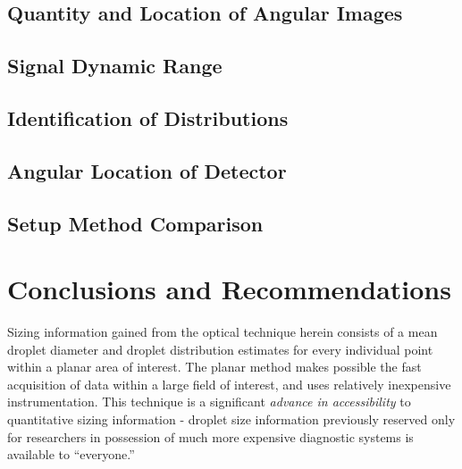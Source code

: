 
 
    \subsection{Quantity and Location of Angular Images}
    \label{five_methods}


    \subsection{Signal Dynamic Range}
     \label{dyn_range}


    \subsection{Identification of Distributions}
     \label{dist_id}


    \subsection{Angular Location of Detector}
      \label{ang_loc}


    \subsection{Setup Method Comparison}
     \label{method_comparisons}



\section{Conclusions and Recommendations}

Sizing information gained from the optical technique herein consists of a mean droplet diameter and droplet distribution estimates for every individual point within a planar area of interest.  The planar method makes possible the fast acquisition of data within a large field of interest, and uses relatively inexpensive instrumentation.  This technique  is a significant \textit{advance in accessibility} to quantitative sizing information - droplet size information previously reserved only for researchers in possession of much more expensive diagnostic systems is available to ``everyone.''

